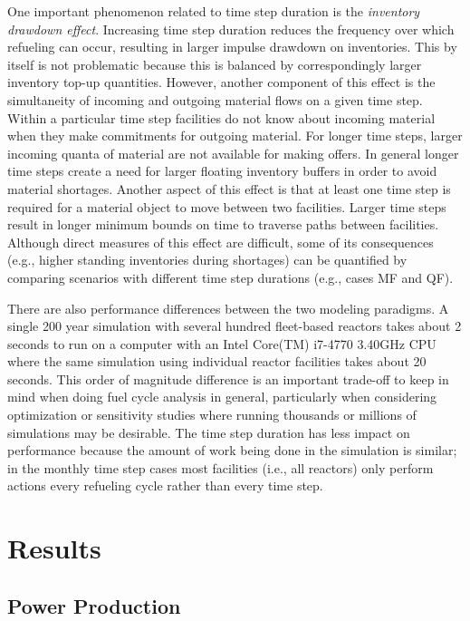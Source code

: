 \documentclass{style}
\begin{document}
One important phenomenon related to time step duration is the \emph{inventory
drawdown effect}.  Increasing time step duration reduces the frequency over
which refueling can occur, resulting in larger impulse drawdown on
inventories. This by itself is not problematic because this is balanced by
correspondingly larger inventory top-up quantities.  However, another
component of this effect is the simultaneity of incoming and outgoing material
flows on a given time step.  Within a particular time step facilities do not
know about incoming material when they make commitments for outgoing material.
For longer time steps, larger incoming quanta of material are not available
for making offers. In general longer time steps create a need for larger
floating inventory buffers in order to avoid material shortages.  Another
aspect of this effect is that at least one time step is required for a
material object to move between two facilities. Larger time steps result in
longer minimum bounds on time to traverse paths between facilities. Although
direct measures of this effect are difficult, some of its consequences (e.g.,
higher standing inventories during shortages) can be quantified by comparing
scenarios with different time step durations (e.g.,  cases MF and QF).

There are also performance differences between the two modeling paradigms.  A
single 200 year simulation with several hundred fleet-based reactors takes
about 2 seconds to run on a computer with an Intel Core(TM) i7-4770 3.40GHz CPU where the same simulation
using individual reactor facilities takes about 20 seconds.  This order of
magnitude difference is an important trade-off to keep in mind when doing fuel
cycle analysis in general, particularly when considering optimization or
sensitivity studies where running thousands or millions of simulations may be
desirable.  The time step duration has less impact on performance because the
amount of work being done in the simulation is similar; in the monthly time
step cases most facilities (i.e., all reactors) only perform actions every
refueling cycle rather than every time step.

\section{Results}

\subsection{Power Production}
\end{document}
